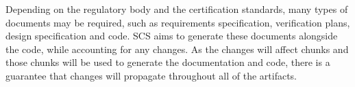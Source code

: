 \documentclass{sig-alternate-05-2015}
\newcommand{\lss}{SCS}
\begin{document}
Depending on the regulatory body and the certification standards, many
types of documents may be required, such as requirements specification,
verification plans, design specification and code. \lss{} aims to generate these
documents alongside the code, while accounting for any changes. As the changes
will affect chunks and those chunks will be used to generate the documentation
and code, there is a guarantee that changes will propagate throughout all of the
artifacts.

\end{document}
